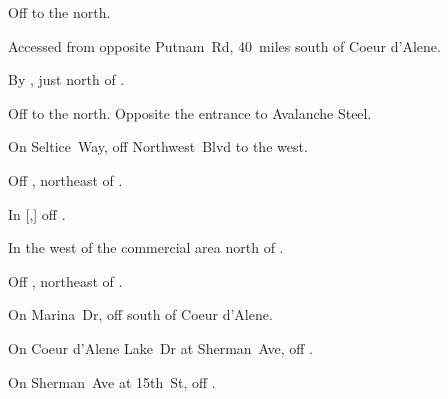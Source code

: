 
\begin{LocationList}

Off   to the north.

Accessed from  opposite Putnam~Rd, 40~miles south of Coeur d'Alene.

By , just north of  .

\Location{\GarageHQ \Garage}
Off   to the north.
Opposite the entrance to Avalanche Steel.

On Seltice~Way, off Northwest~Blvd to the west.

Off , northeast of  .

In [,] off  .

In the west of the commercial area north of  .

\Location{\RecruitmentAgency \Recruitment}
Off , northeast of  .

On Marina~Dr, off  south of Coeur d'Alene.

\Location{\TruckStop \Gas \Rest \Service}
On Coeur d'Alene Lake~Dr at Sherman~Ave, off  .

On Sherman~Ave at 15th~St, off  .

\end{LocationList}
